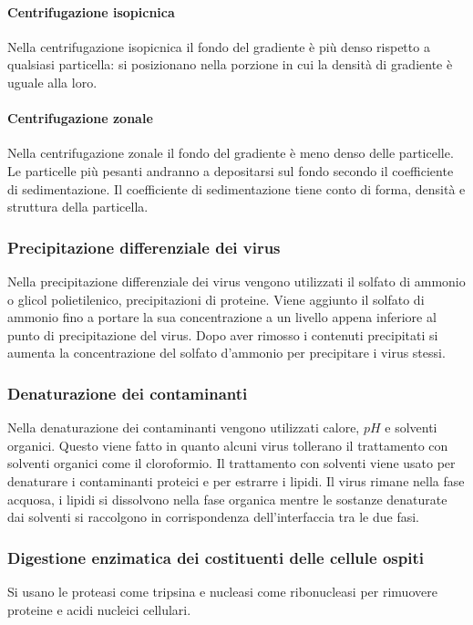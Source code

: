 		\paragraph{Centrifugazione isopicnica}
		Nella centrifugazione isopicnica il fondo del gradiente \`e pi\`u denso rispetto a qualsiasi particella: si posizionano nella porzione in cui la densit\`a di gradiente \`e uguale alla loro.

		\paragraph{Centrifugazione zonale}
		Nella centrifugazione zonale il fondo del gradiente \`e meno denso delle particelle.
		Le particelle pi\`u pesanti andranno a depositarsi sul fondo secondo il coefficiente di sedimentazione.
		Il coefficiente di sedimentazione tiene conto di forma, densit\`a e struttura della particella.

	\subsubsection{Precipitazione differenziale dei virus}
	Nella precipitazione differenziale dei virus vengono utilizzati il solfato di ammonio o glicol polietilenico, precipitazioni di proteine.
	Viene aggiunto il solfato di ammonio fino a portare la sua concentrazione a un livello appena inferiore al punto di precipitazione del virus. 
	Dopo aver rimosso i contenuti precipitati si aumenta la concentrazione del solfato d'ammonio per precipitare i virus stessi. 

	\subsubsection{Denaturazione dei contaminanti}
	Nella denaturazione dei contaminanti vengono utilizzati calore, $pH$ e solventi organici. 
	Questo viene fatto in quanto alcuni virus tollerano il trattamento con solventi organici come il cloroformio.
	Il trattamento con solventi viene usato per denaturare i contaminanti proteici e per estrarre i lipidi. 
	Il virus rimane nella fase acquosa, i lipidi si dissolvono nella fase organica mentre le sostanze denaturate dai solventi si raccolgono in corrispondenza dell'interfaccia tra le due fasi. 

	\subsubsection{Digestione enzimatica dei costituenti delle cellule ospiti}
	Si usano le proteasi come tripsina e nucleasi come ribonucleasi per rimuovere proteine e acidi nucleici cellulari. 

